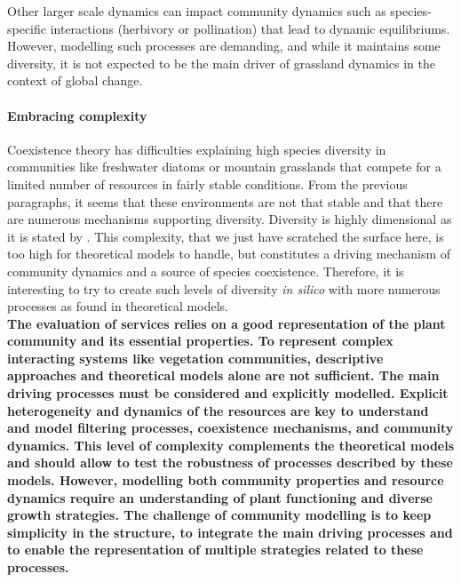 Other larger scale dynamics can impact community dynamics such as species-specific interactions (herbivory or pollination) that lead to dynamic equilibriums. However, modelling such processes are demanding, and while it maintains some diversity, it is not expected to be the main driver of grassland dynamics in the context of global change.


\paragraph{Embracing complexity}

Coexistence theory has difficulties explaining high species diversity in communities like freshwater diatoms or mountain grasslands that compete for a limited number of resources in fairly stable conditions. From the previous paragraphs, it seems that these environments are not that stable and that there are numerous mechanisms supporting diversity. Diversity is highly dimensional as it is stated by \citet{clark_resolving_2007}. This complexity, that we just have scratched the surface here, is too high for theoretical models to handle, but constitutes a driving mechanism of community dynamics and a source of species coexistence. Therefore, it is interesting to try to create such levels of diversity \textit{in silico} with more numerous processes as found in theoretical models.\\



 
 \textbf{The evaluation of services relies on a good representation of the plant community and its essential properties. To represent complex interacting systems like vegetation communities, descriptive approaches and theoretical models alone are not sufficient. The main driving processes must be considered and explicitly modelled. Explicit heterogeneity and dynamics of the resources are key to understand and model filtering processes, coexistence mechanisms, and community dynamics. This level of complexity complements the theoretical models and should allow to test the robustness of processes described by these models. However, modelling both community properties and resource dynamics require an understanding of plant functioning and diverse growth strategies. The challenge of community modelling is to keep simplicity in the structure, to integrate the main driving processes and to enable the representation of multiple strategies related to these processes.}
 

